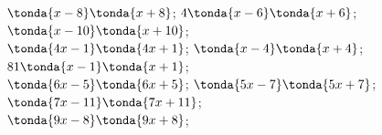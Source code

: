 \begin{esercizio}
\begin{htmulticols}{4}
\begin{enumeratea}
\end{enumeratea}
\end{htmulticols}
\noindent\! \(\tonda{x - 8} \tonda{x + 8}\); \quad 
{} \(4 \tonda{x - 6} \tonda{x + 6}\); \quad 
{} \(\tonda{x - 10} \tonda{x + 10}\); \quad \\
 \(\tonda{4x - 1} \tonda{4x + 1}\); \quad 
{} \(\tonda{x - 4} \tonda{x + 4}\); \quad 
{} \(81 \tonda{x - 1} \tonda{x + 1}\); \quad \\
 \(\tonda{6x - 5} \tonda{6x + 5}\); \quad 
{} \(\tonda{5 x - 7} \tonda{5 x + 7}\); \quad 
{} \(\tonda{7 x - 11} \tonda{7 x + 11}\); \quad \\
 \(\tonda{9 x - 8} \tonda{9 x + 8}\); \quad 

\end{esercizio}
